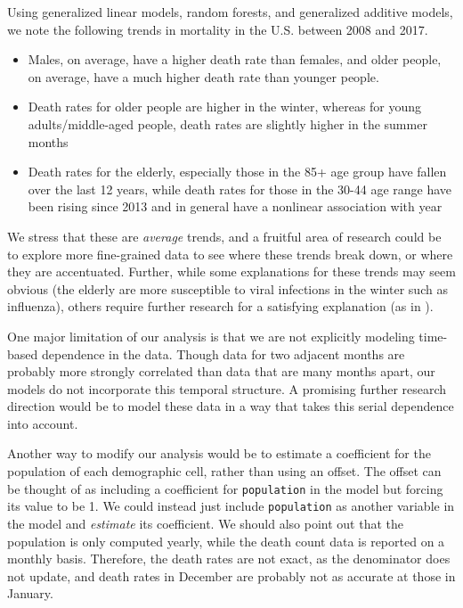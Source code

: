 \documentclass[11pt]{article}
\begin{document}
Using generalized linear models, random forests, and generalized additive models, we note the following trends in mortality in the U.S. between 2008 and 2017.
\begin{itemize}
\item Males, on average, have a higher death rate than females, and older people, on average, have a much higher death rate than younger people. \vspace{-1mm}
\item Death rates for older people are higher in the winter, whereas for young adults/middle-aged people, death rates are slightly higher in the summer months\vspace{-1mm}
\item Death rates for the elderly, especially those in the 85+ age group have fallen over the last 12 years, while death rates for those in the 30-44 age range have been rising since 2013 and in general have a nonlinear association with year\vspace{-1mm}
\end{itemize}
We stress that these are \textit{average} trends, and a fruitful area of research could be to explore more fine-grained data to see where these trends break down, or where they are accentuated. 
Further, while some explanations for these trends may seem obvious (the elderly are more susceptible to viral infections in the winter such as influenza), others require further research for a satisfying explanation (as in \cite{case2015}).

One major limitation of our analysis is that we are not explicitly modeling time-based dependence in the data. 
Though data for two adjacent months are probably more strongly correlated than data that are many months apart, our models do not incorporate this temporal structure. 
A promising further research direction would be to model these data in a way that takes this serial dependence into account.

Another way to modify our analysis would be to estimate a coefficient for the population of each demographic cell, rather than using an offset.
The offset can be thought of as including a coefficient for \verb+population+ in the model but forcing its value to be 1. 
We could instead just include \verb+population+ as another variable in the model and \textit{estimate} its coefficient.
We should also point out that the population is only computed yearly, while the death count data is reported on a monthly basis. 
Therefore, the death rates are not exact, as the denominator does not update, and death rates in December are probably not as accurate at those in January.
\end{document}
